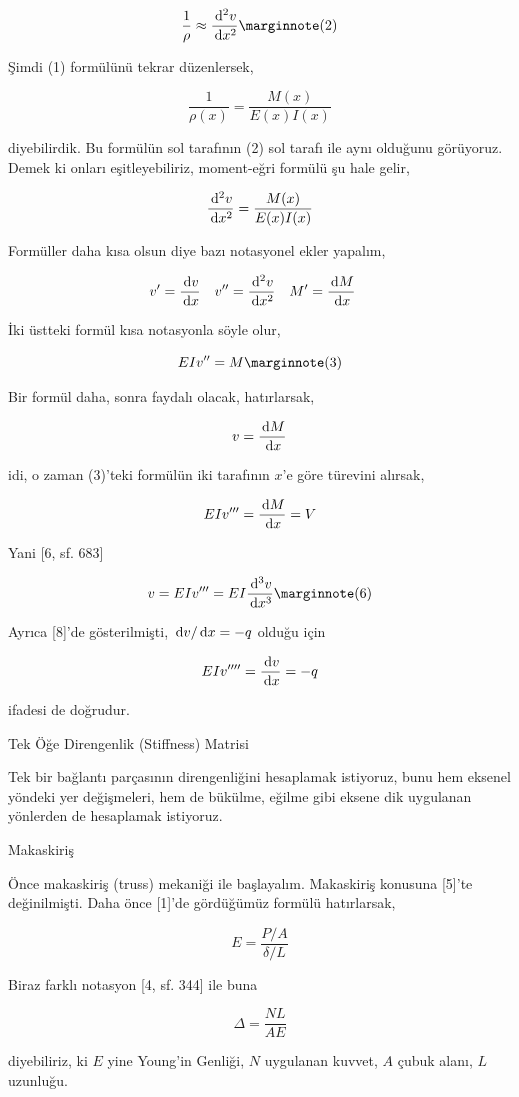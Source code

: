 \documentclass[12pt,fleqn]{article}\usepackage{../../common}
\begin{document}
$$
\frac{1}{\rho} \approx \frac{\ud^2 v}{\ud x^2}
\mlabel{2}
$$

Şimdi (1) formülünü tekrar düzenlersek,

$$
\frac{1}{\rho(x)} = \frac{M(x)}{E(x) I(x)}
$$

diyebilirdik. Bu formülün sol tarafının (2) sol tarafı ile aynı olduğunu
görüyoruz. Demek ki onları eşitleyebiliriz, moment-eğri formülü şu hale gelir,

$$
\frac{\,\mathrm{d}^2 v}{\,\mathrm{d} x^2} = \frac{M(x)}{E(x) I(x)}
$$

Formüller daha kısa olsun diye bazı notasyonel ekler yapalım,

$$
v' = \frac{\,\mathrm{d} v}{\,\mathrm{d} x} \quad 
v'' = \frac{\,\mathrm{d}^2 v}{\,\mathrm{d} x^2} \quad 
M' = \frac{\,\mathrm{d} M}{\,\mathrm{d} x} \quad 
$$

İki üstteki formül kısa notasyonla söyle olur,

$$
EI v'' = M
\mlabel{3}
$$

Bir formül daha, sonra faydalı olacak, hatırlarsak,

$$
v = \frac{\,\mathrm{d} M}{\,\mathrm{d} x}
$$

idi, o zaman (3)'teki formülün iki tarafının $x$'e göre türevini alırsak,

$$
EI v''' = \frac{\,\mathrm{d} M}{\,\mathrm{d} x} = V
$$

Yani [6, sf. 683]

$$
v = EI v''' = EI \frac{\ud^3 v}{\ud x^3}
\mlabel{6}
$$

Ayrıca [8]'de gösterilmişti, $\,\mathrm{d} v / \,\mathrm{d} x = -q$ olduğu için

$$
EI v'''' = \frac{\,\mathrm{d} v}{\,\mathrm{d} x} = -q
$$

ifadesi de doğrudur.

Tek Öğe Direngenlik (Stiffness) Matrisi

Tek bir bağlantı parçasının direngenliğini hesaplamak istiyoruz, bunu hem
eksenel yöndeki yer değişmeleri, hem de bükülme, eğilme gibi eksene dik
uygulanan yönlerden de hesaplamak istiyoruz.

Makaskiriş

Önce makaskiriş (truss) mekaniği ile başlayalım. Makaskiriş konusuna [5]'te
değinilmişti. Daha önce [1]'de gördüğümüz formülü hatırlarsak,

$$
E = \frac{P/A}{\delta / L}
$$

Biraz farklı notasyon [4, sf. 344] ile buna

$$
\Delta = \frac{NL}{AE}
$$

diyebiliriz, ki $E$ yine Young'in Genliği, $N$ uygulanan kuvvet, $A$ çubuk
alanı, $L$ uzunluğu.
\end{document}
